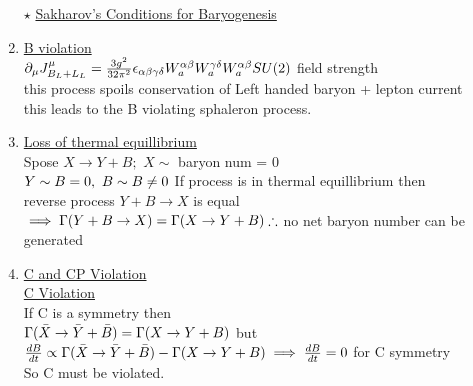 \documentclass[12pt]{amsart}
\begin{document}
\begin{enumerate}
\hdashrule[0.5ex][c]{\linewidth}{0.5pt}{1.5mm}

$\star$
\underline{Sakharov's Conditions for Baryogenesis}\\
\item
\underline{B violation}\\
$\partial_{\mu} J^{\mu}_{B_L + L_L} = \frac{3 g^2}{32 \pi^2} \epsilon_{\alpha \beta \gamma \delta} W_a^{\alpha \beta} W_a^{\gamma \delta}\\
W_a^{\alpha \beta} SU(2)$ field strength\\
this process spoils conservation of Left handed baryon + lepton current\\
this leads to the B violating sphaleron process.\\

\item
\underline{Loss of thermal equillibrium}\\
Spose $X \rightarrow Y+B;\,\, X \sim$ baryon num = 0\\
$Y \sim B =0,\,\, B \sim B \neq 0 \\$
If process is in thermal equillibrium then\\
reverse process $Y+B \rightarrow X$ is equal\\
$\implies \Gamma( Y + B \rightarrow X)= \Gamma(X \rightarrow Y + B)\\
\therefore$ no net baryon number can be generated\\

\item
\underline{C and CP Violation}\\
\underline{C Violation}\\
If C is a symmetry then\\
$\Gamma(\bar{X} \rightarrow \bar{Y} + \bar{B} ) = \Gamma(X \rightarrow Y + B)\\$
but $\frac{d B}{dt} \propto \Gamma(\bar{X} \rightarrow \bar{Y}+\bar{B})-\Gamma(X \rightarrow Y+B)\\
\implies \frac{dB}{dt} = 0$ for C symmetry\\
So C must be violated.


\end{enumerate}
\end{document}
